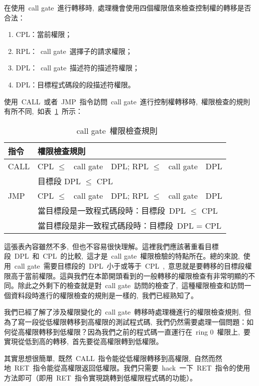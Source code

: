 在使用~call gate~進行轉移時,~處理機會使用四個權限值來檢查控制權的轉移是否合法：

\begin{enumerate}
\item CPL：當前權限；
\item RPL：~call gate~選擇子的請求權限；
\item DPL：~call gate~描述符的描述符權限；
\item DPL：目標程式碼段的段描述符權限。
\end{enumerate}

使用~CALL~或者~JMP~指令訪問~call gate~進行控制權轉移時,~權限檢查的規則有所不同,~如表~\ref{callgate_rules}~所示：

\begin{center}\begin{longtable}{|l|l|}
\caption[]{~call gate~權限檢查規則}\label{callgate_rules}\\
\hline
\textbf{指令} & \textbf{權限檢查規則}\\
\hline
CALL & CPL $\le$ ~call gate~~DPL; RPL $\le$ ~call gate~~DPL\\
     & 目標段 DPL $\le$ CPL\\
\hline
JMP  & CPL $\le$ ~call gate~~DPL; RPL $\le$ ~call gate~~DPL\\
     & 當目標段是一致程式碼段時：目標段~DPL $\le$ CPL\\
     & 當目標段是非一致程式碼段時：目標段~DPL = CPL\\
\hline
\end{longtable}\end{center}

這張表內容雖然不多,~但也不容易很快理解。這裡我們應該著重看目標段~DPL~和~CPL~的比較,~這才是~call gate~權限檢驗的特點所在。總的來說,~使用~call gate~需要目標段的~DPL~小于或等于~CPL~,~意思就是要轉移的目標段權限高于當前權限。這與我們在本節開頭看到的一般轉移的權限檢查有非常明顯的不同。除此之外剩下的檢查就是對~call gate~訪問的檢查了,~這種權限檢查和訪問一個資料段時進行的權限檢查的規則是一樣的,~我們已經熟知了。

我們已經了解了涉及權限變化的~call gate~轉移時處理機進行的權限檢查規則,~但為了寫一段從低權限轉移到高權限的測試程式碼,~我們仍然需要處理一個問題：如何從高權限轉移到低權限？因為我們之前的程式碼一直運行在~ring 0~權限上,~要實現從低到高的轉移,~首先要從高權限轉到低權限。

其實思想很簡單,~既然~CALL~指令能從低權限轉移到高權限,~自然而然地~RET~指令能從高權限返回低權限。我們只需要~hack~一下~RET~指令的使用方法即可（即用~RET~指令實現跳轉到低權限程式碼的功能）。

